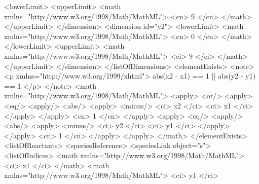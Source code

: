 \documentclass{cekarticle}
\begin{document}
\begin{example}
                    <lowerLimit>
                    <upperLimit>
                        <math xmlns="http://www.w3.org/1998/Math/MathML">
                            <cn> 9 </cn>
                        </math>
                    </upperLimit>
                </dimension>
                <dimension id="y2">
                    <lowerLimit>
                        <math xmlns="http://www.w3.org/1998/Math/MathML">
                            <cn> 0 </cn>
                        </math>
                    </lowerLimit>
                    <upperLimit>
                        <math xmlns="http://www.w3.org/1998/Math/MathML">
                            <ci> 9 </ci>
                        </math>
                    </upperLimit>
                </dimension>
            </listOfDimensions>
            <elementExists>
                <note>
                    <p xmlns="http://www.w3.org/1999/xhtml">
                        abs(x2 - x1) == 1 || abs(y2 - y1) == 1
                    </p>
                </note>                
                <math xmlns="http://www.w3.org/1998/Math/MathML">
                    <apply>
                        <or/>
                        <apply>
                            <eq/>
                            <apply/>
                                <abs/>
                                <apply>
                                    <minus/>
                                    <ci> x2 </ci>
                                    <ci> x1 </ci>
                                </apply>
                            </apply>
                            <cn> 1 </cn>
                        </apply>
                        <apply>
                            <eq/>
                            <apply/>
                                <abs/>
                                <apply>
                                    <minus/>
                                    <ci> y2 </ci>
                                    <ci> y1 </ci>
                                </apply>
                            </apply>
                            <cn> 1 </cn>
                        </apply>
                    </apply>
                </math>
            </elementExists>
            <listOfReactants>
                <speciesReference>
                    <speciesLink object="s">
                        <listOfIndices>
                            <math xmlns="http://www.w3.org/1998/Math/MathML">
                                <ci> x1 </ci>
                            </math>
                            <math xmlns="http://www.w3.org/1998/Math/MathML">
                                <ci> y1 </ci>

\end{example}
\end{document}
